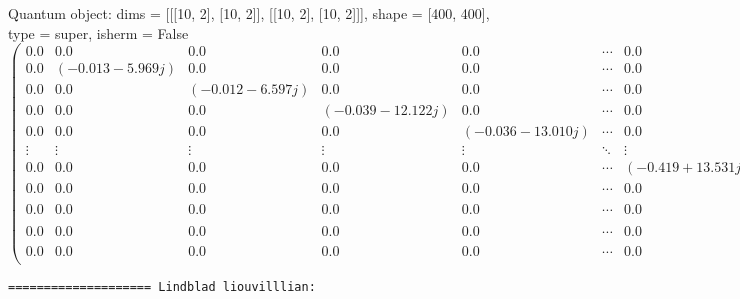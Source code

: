 \documentclass{article}
\begin{document}
    Quantum object: dims = [[[10, 2], [10, 2]], [[10, 2], [10, 2]]], shape = [400, 400], type = super, isherm = False\begin{equation*}\begin{pmatrix}0.0 & 0.0 & 0.0 & 0.0 & 0.0 & \cdots & 0.0 & 0.0 & 0.0 & 0.0 & 0.0\\0.0 & (-0.013-5.969j) & 0.0 & 0.0 & 0.0 & \cdots & 0.0 & 0.0 & 0.0 & 0.0 & 0.0\\0.0 & 0.0 & (-0.012-6.597j) & 0.0 & 0.0 & \cdots & 0.0 & 0.0 & 0.0 & 0.0 & 0.0\\0.0 & 0.0 & 0.0 & (-0.039-12.122j) & 0.0 & \cdots & 0.0 & 0.0 & 0.0 & 0.0 & 0.0\\0.0 & 0.0 & 0.0 & 0.0 & (-0.036-13.010j) & \cdots & 0.0 & 0.0 & 0.0 & 0.0 & 0.0\\\vdots & \vdots & \vdots & \vdots & \vdots & \ddots & \vdots & \vdots & \vdots & \vdots & \vdots\\0.0 & 0.0 & 0.0 & 0.0 & 0.0 & \cdots & (-0.419+13.531j) & 0.0 & 0.0 & 0.0 & 0.0\\0.0 & 0.0 & 0.0 & 0.0 & 0.0 & \cdots & 0.0 & (-0.413+11.758j) & 0.0 & 0.0 & 0.0\\0.0 & 0.0 & 0.0 & 0.0 & 0.0 & \cdots & 0.0 & 0.0 & (-0.441+7.263j) & 0.0 & 0.0\\0.0 & 0.0 & 0.0 & 0.0 & 0.0 & \cdots & 0.0 & 0.0 & 0.0 & (-0.436+5.382j) & 0.0\\0.0 & 0.0 & 0.0 & 0.0 & 0.0 & \cdots & 0.0 & 0.0 & 0.0 & 0.0 & -0.457\\\end{pmatrix}\end{equation*}

    
    \begin{Verbatim}[commandchars=\\\{\}]
==================== Lindblad liouvilllian:
    \end{Verbatim}
\end{document}
